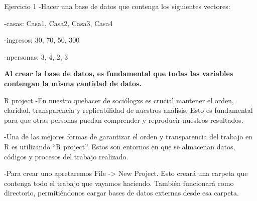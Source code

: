 \documentclass[
  30pt,
  ignorenonframetext,
]{beamer}
\begin{document}
\begin{frame}{Ejercicio 1}
\label{ejercicio-1}
-Hacer una base de datos que contenga los siguientes vectores:

-casas: Casa1, Casa2, Casa3, Casa4

-ingresos: 30, 70, 50, 300

-npersonas: 3, 4, 2, 3

\textbf{Al crear la base de datos, es fundamental que todas las
variables contengan la misma cantidad de datos.}
\end{frame}

\begin{frame}{R project}
\label{r-project}
-En nuestro quehacer de sociólogxs es crucial mantener el orden,
claridad, transparencia y replicabilidad de nuestros análisis. Esto es
fundamental para que otras personas puedan comprender y reproducir
nuestros resultados.

-Una de las mejores formas de garantizar el orden y transparencia del
trabajo en R es utilizando ``R project''. Estos son entornos en que se
almacenan datos, códigos y procesos del trabajo realizado.

-Para crear uno apretaremos File -\textgreater{} New Project. Esto
creará una carpeta que contenga todo el trabajo que vayamos haciendo.
También funcionará como directorio, permitiéndonos cargar bases de datos
externas desde esa carpeta.
\end{frame}
\end{document}
